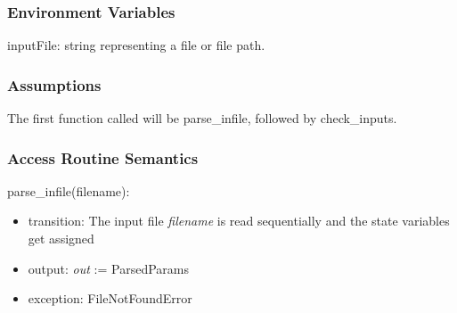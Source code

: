 \documentclass[12pt, titlepage]{article}
\begin{document}
\subsubsection{Environment Variables}

inputFile: string representing a file or file path.\\

\subsubsection{Assumptions}

The first function called will be parse\_infile, followed by check\_inputs.
\subsubsection{Access Routine Semantics}
%

\noindent parse\_infile(filename):
\begin{itemize}
	\item transition: The input file \textit{filename} is read sequentially 
	and the state variables get assigned
	\item output: \textit{out} := ParsedParams
	\item exception: FileNotFoundError 
\end{itemize}
\end{document}
